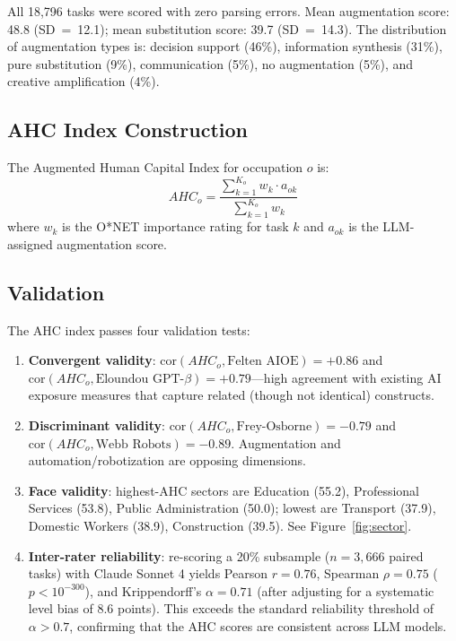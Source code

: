 \documentclass[11pt,a4paper]{article}
\theoremstyle{definition}
\begin{document}
All 18,796 tasks were scored with zero parsing errors. Mean augmentation score: 48.8 (SD~=~12.1); mean substitution score: 39.7 (SD~=~14.3). The distribution of augmentation types is: decision support (46\%), information synthesis (31\%), pure substitution (9\%), communication (5\%), no augmentation (5\%), and creative amplification (4\%).

\subsection{AHC Index Construction}

The Augmented Human Capital Index for occupation $o$ is:
\begin{equation}
AHC_o = \frac{\sum_{k=1}^{K_o} w_k \cdot a_{ok}}{\sum_{k=1}^{K_o} w_k}
\label{eq:ahc}
\end{equation}
where $w_k$ is the O*NET importance rating for task $k$ and $a_{ok}$ is the LLM-assigned augmentation score.

\subsection{Validation}

The AHC index passes four validation tests:
\begin{enumerate}[leftmargin=*]
\item \textbf{Convergent validity}: $\mathrm{cor}(AHC_o, \text{Felten AIOE}) = +0.86$ and $\mathrm{cor}(AHC_o, \text{Eloundou GPT-}\beta) = +0.79$---high agreement with existing AI exposure measures that capture related (though not identical) constructs.
\item \textbf{Discriminant validity}: $\mathrm{cor}(AHC_o, \text{Frey-Osborne}) = -0.79$ and $\mathrm{cor}(AHC_o, \text{Webb Robots}) = -0.89$. Augmentation and automation/robotization are opposing dimensions.
\item \textbf{Face validity}: highest-AHC sectors are Education (55.2), Professional Services (53.8), Public Administration (50.0); lowest are Transport (37.9), Domestic Workers (38.9), Construction (39.5). See Figure~\ref{fig:sector}.
\item \textbf{Inter-rater reliability}: re-scoring a 20\% subsample ($n = 3{,}666$ paired tasks) with Claude Sonnet 4 yields Pearson $r = 0.76$, Spearman $\rho = 0.75$ ($p < 10^{-300}$), and Krippendorff's $\alpha = 0.71$ (after adjusting for a systematic level bias of 8.6 points). This exceeds the standard reliability threshold of $\alpha > 0.7$, confirming that the AHC scores are consistent across LLM models.
\end{enumerate}
\end{document}

